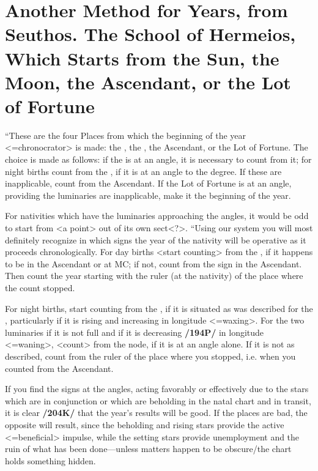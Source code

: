 \section{Another Method for Years, from Seuthos. The School of Hermeios, Which Starts from the Sun, the Moon, the Ascendant, or the Lot of Fortune}

“These are the four Places from which the beginning of the year <=chronocrator> is made: the \Sun, the \Moon, the Ascendant, or the Lot of Fortune. The choice is made as follows: if the \Sun\xspace is at an angle, it is necessary to count from it; for night births count from the \Moon, if it is at an angle to the degree. If these are inapplicable, count from the Ascendant. If the Lot of Fortune is at an angle, providing the luminaries are inapplicable, make it the beginning of the year. 

For nativities which have the luminaries approaching the angles, it would be odd to start from <a point> out of its own sect<?>. “Using our system you will most definitely recognize in which signs the year of the nativity will be operative as it proceeds chronologically. For day births <start counting> from the \Sun, if it happens to be
in the Ascendant or at MC; if not, count from the sign in the Ascendant. Then count the year starting with the ruler (at the nativity) of the place where the count stopped. 

For night births, start counting from the \Moon, if it is situated as was described for the \Sun, particularly if it is rising and increasing in longitude <=waxing>. For the two luminaries if it is not full and if it is decreasing \textbf{/194P/} in longitude <=waning>, <count> from the node, if it is at an angle alone. If it is not as described, count from the ruler of the place where you stopped, i.e. when you counted from the Ascendant. 

If you find the signs at the angles, acting favorably or effectively due to the stars which are in conjunction or which are beholding in the natal chart and in transit, it is clear \textbf{/204K/} that the year’s results will be good. If the places are bad, the opposite will result, since the beholding and rising stars provide the active <=beneficial> impulse,
while the setting stars provide unemployment and the ruin of what has been done—unless matters happen to be obscure/the chart holds something hidden.

\newpage